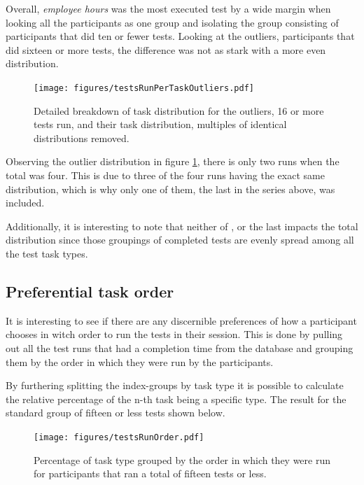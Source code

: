 \documentclass[nofilelist,dvipsnames]{cslthse-msc}
\begin{document}
        Overall, \textit{employee hours} was the most executed test by a wide
        margin when looking all the participants as one group and isolating the
        group consisting of participants that did ten or fewer tests. Looking at
        the outliers, participants that did sixteen or more tests, the
        difference was not as stark with a more even distribution.

				\begin{figure}[h!]
					\centering
					\texttt{[image: figures/testsRunPerTaskOutliers.pdf]}
          \caption{
            Detailed breakdown of task distribution for the outliers, 16 or
            more tests run, and their task distribution, multiples of identical
            distributions removed.
          }
          \label{label_testsRunPerTaskOutliers}
				\end{figure}

        Observing the outlier distribution in figure
        \ref{label_testsRunPerTaskOutliers}, there is only two  runs
        when the total was four. This is due to three of the four runs having
        the exact same distribution, which is why only one of them, the last in
        the series above, was included.

        Additionally, it is interesting to note that neither of ,
         or the last  impacts the total distribution
        since those groupings of completed tests are evenly spread among all the
        test task types.

      \newpage
      \subsection{Preferential task order}

        It is interesting to see if there are any discernible preferences
        of how a participant chooses in witch order to run the tests in their
        session. This is done by pulling out all the test runs that had a
        completion time from the database and grouping them by the order in
        which they were run by the participants.

        By furthering splitting the index-groups by task type it is possible to
        calculate the relative percentage of the n-th task being a specific
        type. The result for the standard group of fifteen or less tests shown
        below.
				\begin{figure}[ht!]
					\centering
					\texttt{[image: figures/testsRunOrder.pdf]}
          \caption{
            Percentage of task type grouped by the order in which they were
            run for participants that ran a total of fifteen tests or less.
          }
          \label{label_testsRunOrder}
        \end{figure}
\end{document}
